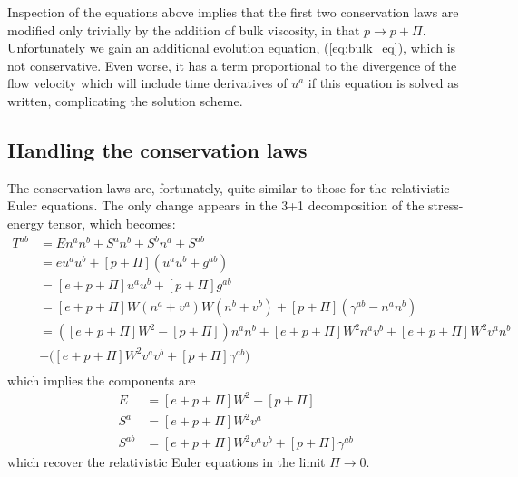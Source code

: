 \documentclass[12pt]{article}
\numberwithin{equation}{section}
\begin{document}
Inspection of the equations above implies that the first two conservation laws are modified only trivially by the addition of bulk viscosity, in that $p \to p + \Pi$.
Unfortunately we gain an additional evolution equation, (\ref{eq:bulk_eq}), which is not conservative.
Even worse, it has a term proportional to the divergence of the flow velocity which will include time derivatives of $u^a$ if this equation is solved as written, complicating the solution scheme.

\subsection{Handling the conservation laws}

The conservation laws are, fortunately, quite similar to those for the relativistic Euler equations.
The only change appears in the 3+1 decomposition of the stress-energy tensor, which becomes:
\begin{equation}
\begin{aligned}
T^{ab} &= E n^a n^b + S^a n^b + S^b n^a + S^{ab} \\
&= e u^a u^b + [p+\Pi] (u^a u^b + g^{ab}) \\
&= [e+p+\Pi] u^a u^b + [p+\Pi] g^{ab} \\
&= [e+p+\Pi] W (n^a + v^a) W (n^b + v^b) + [p+\Pi] (\gamma^{ab} - n^a n^b) \\
&= ([e+p+\Pi] W^2 - [p+\Pi]) n^a n^b + [e+p+\Pi] W^2 n^a v^b + [e+p+\Pi] W^2 v^a n^b \\
&+ \Big( [e+p+\Pi] W^2 v^a v^b + [p+\Pi] \gamma^{ab} \Big) \\
\end{aligned}
\end{equation}
which implies the components are
\begin{equation}
\begin{aligned}
E      &= [e+p+\Pi] W^2 - [p+\Pi] \\
S^a    &= [e+p+\Pi] W^2 v^a \\
S^{ab} &= [e+p+\Pi] W^2 v^a v^b + [p+\Pi] \gamma^{ab}
\end{aligned}
\end{equation}
which recover the relativistic Euler equations in the limit $\Pi \to 0$.
\end{document}
